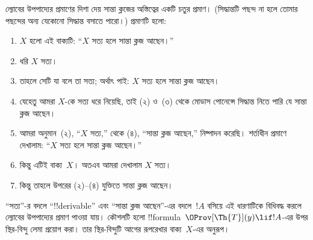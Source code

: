 \documentclass[../../../include/open-logic-section]{subfiles}
\begin{document}
\begin{explain}
ল্যোবের উপপাদ্যের প্রমাণের দিশা দেয় সান্তা ক্লজের অস্তিত্বের একটি চতুর
প্রমাণ। (সিদ্ধান্তটি পছন্দ না হলে তোমার পছন্দের অন্য যেকোনো সিদ্ধান্ত
বসাতে পারো।) প্রমাণটি হলো:
\begin{enumerate}
\item $X$ হলো এই বাক্যটি: ``$X$ সত্য হলে সান্তা ক্লজ আছেন।''
\item ধরি $X$ সত্য।
\item তাহলে সেটি যা বলে তা সত্য; অর্থাৎ পাই: $X$ সত্য হলে সান্তা ক্লজ
  আছেন।
\item যেহেতু আমরা $X$-কে সত্য ধরে নিয়েছি, তাই (২) ও~(৩) থেকে মোডাস
  পোনেন্সে সিদ্ধান্ত নিতে পারি যে সান্তা ক্লজ আছেন।
\item আমরা অনুমান~(২), ``$X$ সত্য,'' থেকে (৪), ``সান্তা ক্লজ আছেন,''
  নিষ্পাদন করেছি। শর্তাধীন প্রমাণে দেখালাম: ``$X$ সত্য হলে সান্তা ক্লজ
  আছেন।''
\item কিন্তু এটিই বাক্য~$X$। অতএব আমরা দেখালাম $X$ সত্য।
\item কিন্তু তাহলে উপরের (২)--(৪) যুক্তিতে সান্তা ক্লজ আছেন।
\end{enumerate}
``সত্য''-র বদলে ``!!{derivable}'' এবং ``সান্তা ক্লজ আছেন''-এর
বদলে~$!A$ বসিয়ে এই ধারণাটিকে বিধিবদ্ধ করলে ল্যোবের উপপাদ্যের প্রমাণ
পাওয়া যায়। কৌশলটি হলো !!{formula}~$\OProv[\Th{T}](y) \lif !A$-এর উপর
স্থির-বিন্দু লেমা প্রয়োগ করা। তার স্থির-বিন্দুটি আগের রূপরেখার বাক্য~$X$-এর
অনুরূপ।
\end{explain}
\end{document}
